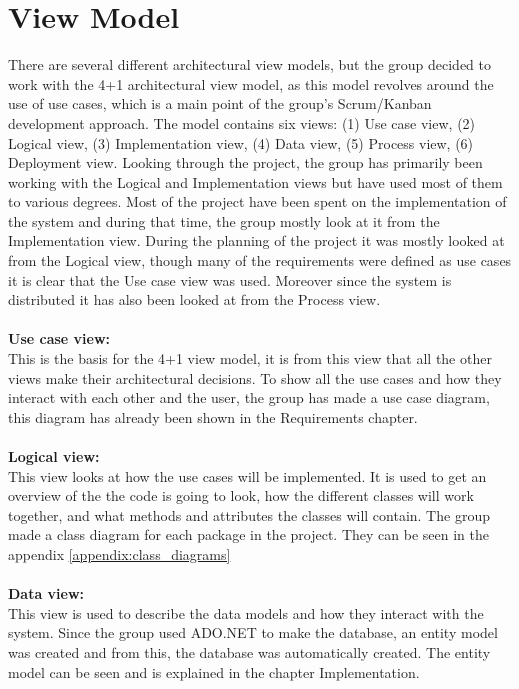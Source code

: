 \section{View Model}
There are several different architectural view models, but the group decided
to work with the 4+1 architectural view model, as this model revolves around
 the use of use cases, which is a main point of the group’s Scrum/Kanban
 development approach. The model contains six views: (1) Use case view, (2)
  Logical view, (3) Implementation view, (4) Data view, (5) Process view,
  (6) Deployment view. Looking through the project, the group has primarily
   been working with the Logical and Implementation views but have used most
   of them to various degrees. Most of the project have been spent on the
    implementation of the system and during that time, the group mostly look
    at it from the Implementation view. During the planning of the project
     it was mostly looked at from the Logical view, though many of the
     requirements were defined as use cases it is clear that the Use case
     view was used. Moreover since the system is distributed it has also
     been looked at from the Process view.
\\
\\
\textbf{Use case view:}
\\
This is the basis for the 4+1 view model, it is from this view that all the
 other views make their architectural decisions. To show all the use cases
 and how they interact with each other and the user, the group has made a use
  case diagram, this diagram has already been shown in the Requirements chapter.
\\
\\
\textbf{Logical view:}
\\
This view looks at how the use cases will be implemented. It is used to get
 an overview of the the code is going to look, how the different classes will
  work together, and what methods and attributes the classes will contain. The
   group made a class diagram for each package in the project. They can be
    seen in the appendix \ref{appendix:class_diagrams}
\\
\\
\textbf{Data view:}
\\
This view is used to describe the data models and how they interact with the
 system. Since the group used ADO.NET to make the database, an entity model
 was created and from this, the database was automatically created. The entity
  model can be seen and is explained in the chapter Implementation.
